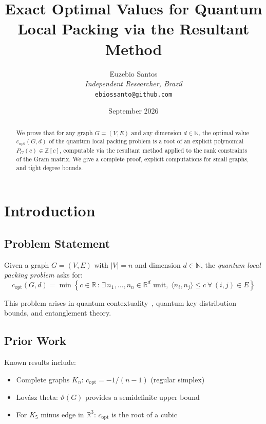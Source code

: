 \documentclass[11pt]{article}
\title{Exact Optimal Values for Quantum Local Packing via the Resultant Method}
\author{Euzebio Santos\\
\textit{Independent Researcher, Brazil}\\
\texttt{ebiossanto@github.com}}
\date{September 2026}
\theoremstyle{definition}
\begin{document}
\maketitle

\begin{abstract}
We prove that for any graph $G = (V,E)$ and any dimension $d \in \mathbb{N}$,
the optimal value $c_{\mathrm{opt}}(G,d)$ of the quantum local packing problem
is a root of an explicit polynomial $P_G(c) \in \mathbb{Z}[c]$, computable via
the resultant method applied to the rank constraints of the Gram matrix.
We give a complete proof, explicit computations for small graphs, and
tight degree bounds.
\end{abstract}

\section{Introduction}

\subsection{Problem Statement}

Given a graph $G = (V,E)$ with $|V| = n$ and dimension $d \in \mathbb{N}$,
the \emph{quantum local packing problem} asks for:
\begin{equation}\label{eq:problem}
c_{\mathrm{opt}}(G,d) = \min \left\{ c \in \mathbb{R} \,:\, \exists\, n_1,\ldots,n_n \in \mathbb{R}^d \text{ unit},\; \langle n_i, n_j \rangle \le c\ \forall\, (i,j) \in E \right\}
\end{equation}

This problem arises in quantum contextuality~\cite{klyachko2008, pirónio2010},
quantum key distribution bounds, and entanglement theory.

\subsection{Prior Work}

Known results include:
\begin{itemize}
    \item Complete graphs $K_n$: $c_{\mathrm{opt}} = -1/(n-1)$ (regular simplex)
    \item Lov\'{a}sz theta: $\vartheta(G)$ provides a semidefinite upper bound
    \item For $K_5$ minus edge in $\mathbb{R}^3$: $c_{\mathrm{opt}}$ is the root
    of a cubic~\cite{soares2026}
\end{itemize}
\end{document}

